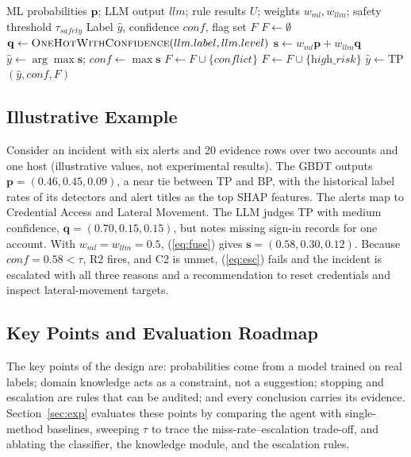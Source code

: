 \documentclass[conference]{IEEEtran}
\begin{document}
\begin{algorithm}[t]
\caption{FuseEvidence}
\label{alg:fuse}
\footnotesize
\begin{algorithmic}[1]
\Require ML probabilities $\mathbf{p}$; LLM output $llm$; rule results
$U$; weights $w_{ml}, w_{llm}$; safety threshold $\tau_{safety}$
\Ensure Label $\hat{y}$, confidence $conf$, flag set $F$
\State $F \gets \emptyset$
\State $\mathbf{q} \gets \textsc{OneHotWithConfidence}(llm.label, llm.level)$
\State $\mathbf{s} \gets w_{ml}\mathbf{p} + w_{llm}\mathbf{q}$
\State $\hat{y} \gets \arg\max \mathbf{s}$;\; $conf \gets \max \mathbf{s}$
 $F \gets F \cup \{\textit{conflict}\}$ \EndIf
{}
  \State $F \gets F \cup \{\textit{high\_risk}\}$
     $\hat{y} \gets \mathrm{TP}$ \EndIf
\EndIf
\State \Return $(\hat{y}, conf, F)$
\end{algorithmic}
\end{algorithm}

\subsection{Illustrative Example}
Consider an incident with six alerts and 20 evidence rows over two
accounts and one host (illustrative values, not experimental results).
The GBDT outputs $\mathbf{p}=(0.46,0.45,0.09)$, a near tie between TP
and BP, with the historical label rates of its detectors and alert
titles as the top SHAP features. The alerts map to Credential Access and Lateral Movement. The
LLM judges TP with medium confidence, $\mathbf{q}=(0.70,0.15,0.15)$, but
notes missing sign-in records for one account. With
$w_{ml}=w_{llm}=0.5$, (\ref{eq:fuse}) gives $\mathbf{s}=(0.58,0.30,0.12)$.
Because $\mathit{conf}=0.58<\tau$, R2 fires, and C2 is unmet,
(\ref{eq:esc}) fails and the incident is escalated with all three
reasons and a recommendation to reset credentials and inspect
lateral-movement targets.

\subsection{Key Points and Evaluation Roadmap}
The key points of the design are: probabilities come from a model
trained on real labels; domain knowledge acts as a constraint, not a
suggestion; stopping and escalation are rules that can be audited; and
every conclusion carries its evidence.
Section~\ref{sec:exp} evaluates these points by comparing the agent
with single-method baselines, sweeping $\tau$ to trace the
miss-rate--escalation trade-off, and ablating the classifier, the
knowledge module, and the escalation rules.
\end{document}
